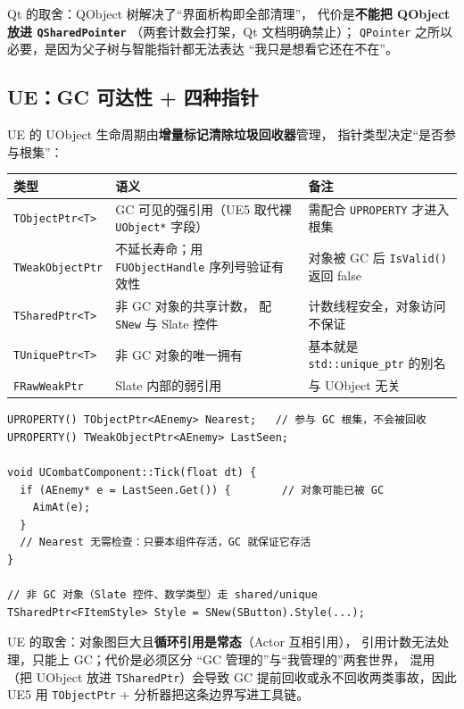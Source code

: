 \documentclass[12pt,a4paper,fontset=fandol]{ctexbook}
\begin{document}
Qt 的取舍：QObject 树解决了``界面析构即全部清理''，
代价是\textbf{不能把 QObject 放进 \texttt{QSharedPointer}}
（两套计数会打架，Qt 文档明确禁止）；
\texttt{QPointer} 之所以必要，是因为父子树与智能指针都无法表达
``我只是想看它还在不在''。

\subsection{UE：GC 可达性 + 四种指针}

UE 的 UObject 生命周期由\textbf{增量标记清除垃圾回收器}管理，
指针类型决定``是否参与根集''：

\begin{longtable}{@{}>{\raggedright\arraybackslash}p{}>{\raggedright\arraybackslash}p{}>{\raggedright\arraybackslash}p{}@{}}
\toprule
\textbf{类型} & \textbf{语义} & \textbf{备注} \\
\midrule
\texttt{TObjectPtr<T>} & GC 可见的强引用（UE5 取代裸 \texttt{UObject*}
  字段） & 需配合 \texttt{UPROPERTY} 才进入根集 \\
\addlinespace
\texttt{TWeakObjectPtr} & 不延长寿命；用
  \texttt{FUObjectHandle} 序列号验证有效性 &
  对象被 GC 后 \texttt{IsValid()} 返回 false \\
\addlinespace
\texttt{TSharedPtr<T>} & 非 GC 对象的共享计数，
  配 \texttt{SNew} 与 Slate 控件 & 计数线程安全，对象访问不保证 \\
\addlinespace
\texttt{TUniquePtr<T>} & 非 GC 对象的唯一拥有 &
  基本就是 \texttt{std::unique\_ptr} 的别名 \\
\addlinespace
\texttt{FRawWeakPtr} & Slate 内部的弱引用 &
  与 UObject 无关 \\
\bottomrule
\end{longtable}

\begin{lstlisting}[caption={UE 的引用与有效性检查}]
UPROPERTY() TObjectPtr<AEnemy> Nearest;   // 参与 GC 根集，不会被回收
UPROPERTY() TWeakObjectPtr<AEnemy> LastSeen;

void UCombatComponent::Tick(float dt) {
  if (AEnemy* e = LastSeen.Get()) {        // 对象可能已被 GC
    AimAt(e);
  }
  // Nearest 无需检查：只要本组件存活，GC 就保证它存活
}

// 非 GC 对象（Slate 控件、数学类型）走 shared/unique
TSharedPtr<FItemStyle> Style = SNew(SButton).Style(...);
\end{lstlisting}

UE 的取舍：对象图巨大且\textbf{循环引用是常态}（Actor 互相引用），
引用计数无法处理，只能上 GC；代价是必须区分
``GC 管理的''与``我管理的''两套世界，
混用（把 UObject 放进 \texttt{TSharedPtr}）会导致
GC 提前回收或永不回收两类事故，因此 UE5 用
\texttt{TObjectPtr} + 分析器把这条边界写进工具链。
\end{document}
